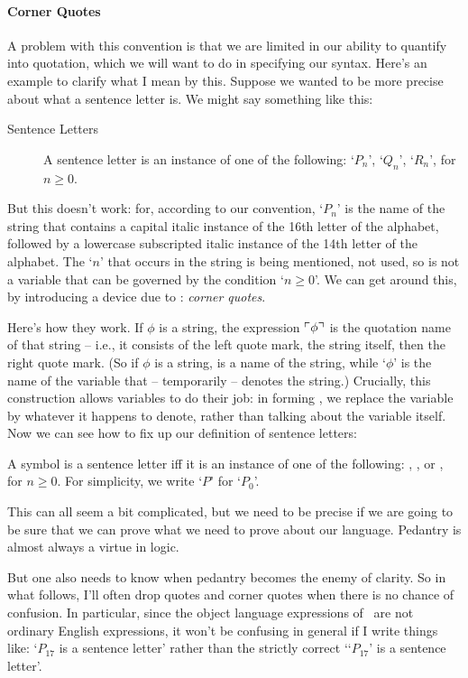 \paragraph{Corner Quotes} A problem with this convention is that we are limited in our ability to quantify into quotation, which we will want to do in specifying our syntax. Here's an example to clarify what I mean by this. Suppose we wanted to be more precise about what a sentence letter is. We might say something like this: \begin{description} \item[Sentence Letters]
	A sentence letter is an instance of one of the following: `$P_{n}$', `$Q_{n}$', `$R_{n}$', for $n\geqslant 0$. 
\end{description}
But this doesn't work: for, according to our convention, `$P_{n}$' is the name of the string that contains a capital italic instance of the 16th letter of the alphabet, followed by a lowercase subscripted italic instance of the 14th letter of the alphabet. The `$n$' that occurs in the string is being mentioned, not used, so is not a variable that can be governed by the condition `$n\geqslant 0$'. We can get around this, by introducing a device due to \citet[§6]{quine}: \emph{corner quotes}. 

Here's how they work. If $\phi$ is a string, the expression $\ulcorner \phi \urcorner$ is the quotation name of that string – i.e., it consists of the left quote mark, the string itself, then the right quote mark. (So if $\phi$ is a string, \cquote{\phi} is a name of the string, while `$\phi$' is the name of the variable that – temporarily – denotes the string.) Crucially, this construction allows variables to do their job: in forming \cquote{\phi}, we replace the variable by whatever it happens to denote, rather than talking about the variable itself. Now we can see how to fix up our definition of sentence letters:
\begin{definition}
 	A symbol is a sentence letter iff it is an instance of one of the following: , , or , for $n \geqslant 0$. For simplicity, we write `$P$' for `$P_{0}$'. 
 \end{definition}
This can all seem a bit complicated, but we need to be precise if we are going to be sure that we can prove what we need to prove about our language. Pedantry is almost always a virtue in logic.

But one also needs to know when pedantry becomes the enemy of clarity. So in what follows, I'll often drop quotes and corner quotes when there is no chance of confusion. In particular, since the object language expressions of \lone\ are not ordinary English expressions, it won't be confusing in general if I write things like: `$P_{17}$ is a sentence letter' rather than the strictly correct `{`$P_{17}$'} is a sentence letter'. 


